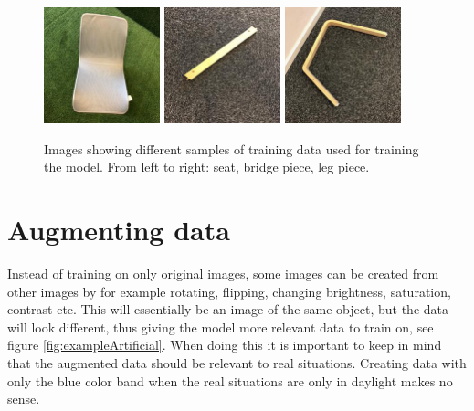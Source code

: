 \begin{figure}[hbtp]
\begin{center}
\includegraphics[width = 0.3\textwidth]{./Images/image_31.jpg}
\includegraphics[width = 0.3\textwidth]{./Images/image_133.jpg}
\includegraphics[width = 0.3\textwidth]{./Images/image_136.jpg}
\caption{Images showing different samples of training data used for training the model. From left to right: seat, bridge piece, leg piece.}
\label{fig:exampleData}
\end{center}
\end{figure}

\section{Augmenting data}
\label{sec:NNaugment}
Instead of training on only original images, some images can be created from other images by for example rotating, flipping, changing brightness, saturation, contrast etc.  This will essentially be an image of the same object, but the data will look different, thus giving the model more relevant data to train on, see figure \ref{fig:exampleArtificial}.
When doing this it is important to keep in mind that the augmented data should be relevant to real situations.
Creating data with only the blue color band when the real situations are only in daylight makes no sense.

